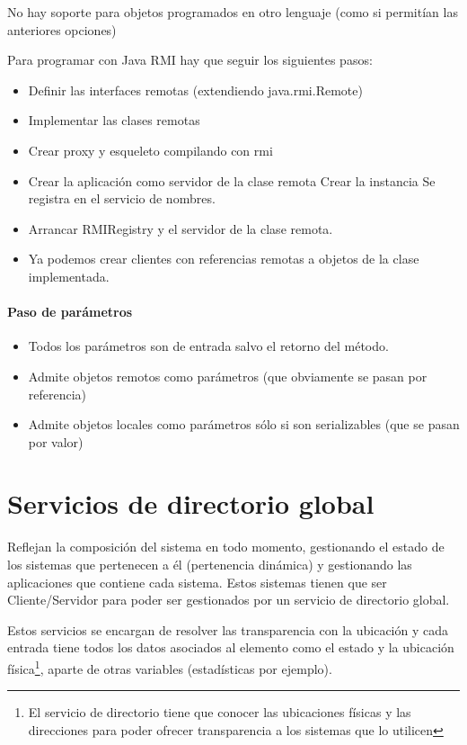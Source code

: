 \obs No hay soporte para objetos programados en otro lenguaje (como si permitían las anteriores opciones)

Para programar con Java RMI hay que seguir los siguientes pasos:
\begin{itemize}
	\item Definir las interfaces remotas (extendiendo java.rmi.Remote)
	\item Implementar las clases remotas

	\item Crear proxy y esqueleto compilando con rmi
	\item Crear la aplicación como servidor de la clase remota
		\subitem Crear la instancia
		\subitem Se registra en el servicio de nombres.
	\item Arrancar RMIRegistry y el servidor de la clase remota.
	\item Ya podemos crear clientes con referencias remotas a objetos de la clase implementada.
\end{itemize}

\paragraph{Paso de parámetros}
\begin{itemize}
	\item Todos los parámetros son de entrada salvo el retorno del método.
	\item Admite objetos remotos como parámetros (que obviamente se pasan por referencia)
	\item Admite objetos locales como parámetros sólo si son serializables (que se pasan por valor)
\end{itemize}

\section{Servicios de directorio global}

Reflejan la composición del sistema en todo momento, gestionando el estado de los sistemas que pertenecen a él (pertenencia dinámica) y gestionando las aplicaciones que contiene cada sistema. Estos sistemas tienen que ser Cliente/Servidor para poder ser gestionados por un servicio de directorio global.

Estos servicios se encargan de resolver las transparencia con la ubicación y cada entrada tiene todos los datos asociados al elemento como el estado y la ubicación física\footnote{El servicio de directorio tiene que conocer las ubicaciones físicas y las direcciones para poder ofrecer transparencia a los sistemas que lo utilicen}, aparte de otras variables (estadísticas por ejemplo).


